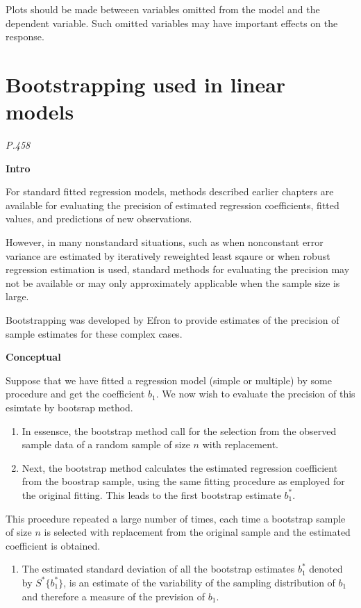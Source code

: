 \documentclass[]{book}
\providecommand{\tightlist}{%
  \setlength{\itemsep}{0pt}\setlength{\parskip}{0pt}}
\begin{document}
Plots should be made betweeen variables omitted from the model and the dependent variable. Such omitted variables may have important effects on the response.

\hypertarget{bootstrapping-used-in-linear-models}{%
\section{Bootstrapping used in linear models}\label{bootstrapping-used-in-linear-models}}

\emph{P.458}

\textbf{Intro}

For standard fitted regression models, methods described earlier chapters are available for evaluating the precision of estimated regression coefficients, fitted values, and predictions of new observations.

However, in many nonstandard situations, such as when nonconstant error variance are estimated by iteratively reweighted least sqaure or when robust regression estimation is used, standard methods for evaluating the precision may not be available or may only approximately applicable when the sample size is large.

Bootstrapping was developed by Efron to provide estimates of the precision of sample estimates for these complex cases.

\textbf{Conceptual}

Suppose that we have fitted a regression model (simple or multiple) by some procedure and get the coefficient \(b_1\). We now wish to evaluate the precision of this esimtate by bootsrap method.

\begin{enumerate}
\def\labelenumi{(\arabic{enumi})}
\item
  In essensce, the bootstrap method call for the selection from the observed sample data of a random sample of size \(n\) with replacement.
\item
  Next, the bootstrap method calculates the estimated regression coefficient from the boostrap sample, using the same fitting procedure as employed for the original fitting. This leads to the first bootstrap estimate \(b_1^*\).
\end{enumerate}

This procedure repeated a large number of times, each time a bootstrap sample of size \(n\) is selected with replacement from the original sample and the estimated coefficient is obtained.

\begin{enumerate}
\def\labelenumi{(\arabic{enumi})}
\setcounter{enumi}{2}
\tightlist
\item
  The estimated standard deviation of all the bootstrap estimates \(b_1^*\) denoted by \(S^*\{b_1^*\}\), is an estimate of the variability of the sampling distribution of \(b_1\) and therefore a measure of the prevision of \(b_1\).
\end{enumerate}
\end{document}
